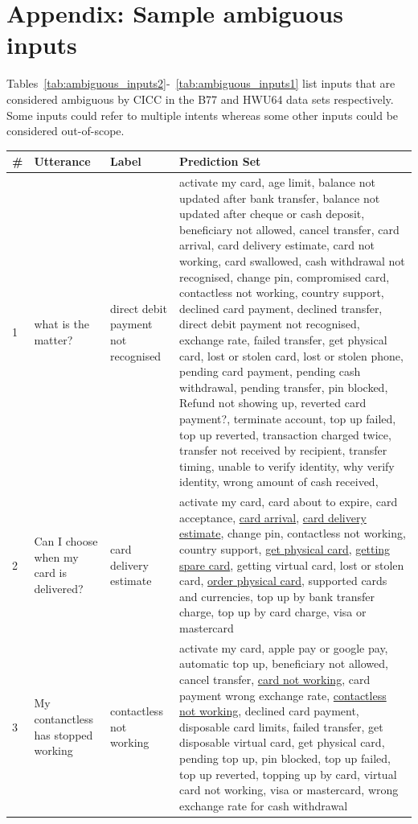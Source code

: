 \documentclass[11pt]{article}
\begin{document}
\section{Appendix: Sample ambiguous inputs}
\label{sec:appendix_ambiguous_inputs}
Tables~\ref{tab:ambiguous_inputs2}-~\ref{tab:ambiguous_inputs1} list inputs that are considered ambiguous by CICC in the B77 and HWU64 data sets respectively. Some inputs could refer to multiple intents whereas some other inputs could be considered out-of-scope.

\begin{table}[h!]
    \centering
    \footnotesize
    \begin{tabular}{l p{} p{} p{}}

    \toprule
    \# & Utterance & Label & Prediction Set \\
    \midrule
1 & what is the matter? & direct debit payment not recognised & activate my card, age limit, balance not updated after bank transfer, balance not updated after cheque or cash deposit, beneficiary not allowed, cancel transfer, card arrival, card delivery estimate, card not working, card swallowed, cash withdrawal not recognised, change pin, compromised card, contactless not working, country support, declined card payment, declined transfer, direct debit payment not recognised, exchange rate, failed transfer, get physical card, lost or stolen card, lost or stolen phone, pending card payment, pending cash withdrawal, pending transfer, pin blocked, Refund not showing up, reverted card payment?, terminate account, top up failed, top up reverted, transaction charged twice, transfer not received by recipient, transfer timing, unable to verify identity, why verify identity, wrong amount of cash received,  \\
2 & Can I choose when my card is delivered? & card delivery estimate & activate my card, card about to expire, card acceptance, \underline{card arrival}, \underline{card delivery estimate}, change pin, contactless not working, country support, \underline{get physical card}, \underline{getting spare card}, getting virtual card, lost or stolen card, \underline{order physical card}, supported cards and currencies, top up by bank transfer charge, top up by card charge, visa or mastercard \\
3 & My contanctless has stopped working & contactless not working & activate my card, apple pay or google pay, automatic top up, beneficiary not allowed, cancel transfer, \underline{card not working}, card payment wrong exchange rate, \underline{contactless not working}, declined card payment, disposable card limits, failed transfer, get disposable virtual card, get physical card, pending top up, pin blocked, top up failed, top up reverted, topping up by card, virtual card not working, visa or mastercard, wrong exchange rate for cash withdrawal \\

\end{tabular}
\end{table}
\end{document}
